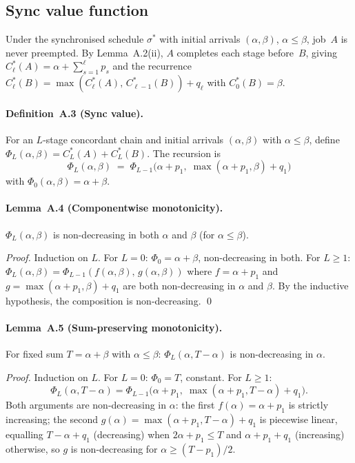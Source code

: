 \documentclass[11pt,titlepage]{article}
\begin{document}
\subsection{Sync value function}

Under the synchronised schedule $\sigma^*$ with initial
arrivals $(\alpha, \beta)$, $\alpha \leq \beta$, job~$A$ is
never preempted. By Lemma~A.2(ii), $A$
completes each stage before~$B$, giving
$C_\ell^*(A) = \alpha + \sum_{s=1}^\ell p_s$ and the
recurrence $C_\ell^*(B) = \max(C_\ell^*(A),\,
C_{\ell-1}^*(B)) + q_\ell$ with $C_0^*(B) = \beta$.

\paragraph{Definition~A.3 (Sync value).}
For an $L$-stage concordant chain and initial arrivals
$(\alpha, \beta)$ with $\alpha \leq \beta$, define
$\Phi_L(\alpha, \beta) = C_L^*(A) + C_L^*(B)$.
The recursion is
\[
  \Phi_L(\alpha, \beta)
  \;=\;
  \Phi_{L-1}\!\bigl(\alpha + p_1,\;
  \max(\alpha + p_1, \beta) + q_1\bigr)
\]
with $\Phi_0(\alpha, \beta) = \alpha + \beta$.

\paragraph{Lemma~A.4 (Componentwise monotonicity).}
$\Phi_L(\alpha, \beta)$ is non-decreasing in both $\alpha$
and $\beta$ (for $\alpha \leq \beta$).

\smallskip\noindent
\emph{Proof.}
Induction on $L$. For $L = 0$: $\Phi_0 = \alpha + \beta$,
non-decreasing in both. For $L \geq 1$: $\Phi_L(\alpha,\beta)
= \Phi_{L-1}(f(\alpha,\beta),\, g(\alpha,\beta))$ where
$f = \alpha + p_1$ and
$g = \max(\alpha + p_1, \beta) + q_1$ are both
non-decreasing in $\alpha$ and $\beta$. By the inductive
hypothesis, the composition is non-decreasing. \qed

\paragraph{Lemma~A.5 (Sum-preserving monotonicity).}
For fixed sum $T = \alpha + \beta$ with $\alpha \leq \beta$:
$\Phi_L(\alpha, T - \alpha)$ is non-decreasing in $\alpha$.

\smallskip\noindent
\emph{Proof.}
Induction on $L$. For $L = 0$: $\Phi_0 = T$, constant.
For $L \geq 1$:
\[
  \Phi_L(\alpha, T{-}\alpha) =
  \Phi_{L-1}\!\bigl(\alpha + p_1,\;
  \max(\alpha + p_1, T{-}\alpha) + q_1\bigr).
\]
Both arguments are non-decreasing in $\alpha$: the first
$f(\alpha) = \alpha + p_1$ is strictly increasing; the
second $g(\alpha) = \max(\alpha + p_1, T-\alpha) + q_1$ is
piecewise linear, equalling $T - \alpha + q_1$ (decreasing)
when $2\alpha + p_1 \leq T$ and $\alpha + p_1 + q_1$
(increasing) otherwise, so $g$ is non-decreasing for
$\alpha \geq (T - p_1)/2$.
\end{document}
